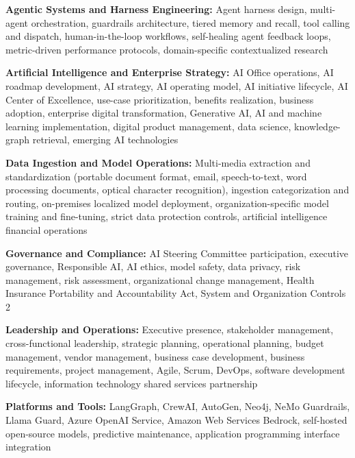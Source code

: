 \documentclass[10pt]{article}
\begin{document}
\noindent\textbf{Agentic Systems and Harness Engineering:} Agent harness design, multi-agent orchestration, guardrails architecture, tiered memory and recall, tool calling and dispatch, human-in-the-loop workflows, self-healing agent feedback loops, metric-driven performance protocols, domain-specific contextualized research

\vspace{0.05in}
\noindent\textbf{Artificial Intelligence and Enterprise Strategy:} AI Office operations, AI roadmap development, AI strategy, AI operating model, AI initiative lifecycle, AI Center of Excellence, use-case prioritization, benefits realization, business adoption, enterprise digital transformation, Generative AI, AI and machine learning implementation, digital product management, data science, knowledge-graph retrieval, emerging AI technologies

\vspace{0.05in}
\noindent\textbf{Data Ingestion and Model Operations:} Multi-media extraction and standardization (portable document format, email, speech-to-text, word processing documents, optical character recognition), ingestion categorization and routing, on-premises localized model deployment, organization-specific model training and fine-tuning, strict data protection controls, artificial intelligence financial operations

\vspace{0.05in}
\noindent\textbf{Governance and Compliance:} AI Steering Committee participation, executive governance, Responsible AI, AI ethics, model safety, data privacy, risk management, risk assessment, organizational change management, Health Insurance Portability and Accountability Act, System and Organization Controls 2

\vspace{0.05in}
\noindent\textbf{Leadership and Operations:} Executive presence, stakeholder management, cross-functional leadership, strategic planning, operational planning, budget management, vendor management, business case development, business requirements, project management, Agile, Scrum, DevOps, software development lifecycle, information technology shared services partnership

\vspace{0.05in}
\noindent\textbf{Platforms and Tools:} LangGraph, CrewAI, AutoGen, Neo4j, NeMo Guardrails, Llama Guard, Azure OpenAI Service, Amazon Web Services Bedrock, self-hosted open-source models, predictive maintenance, application programming interface integration
\end{document}
